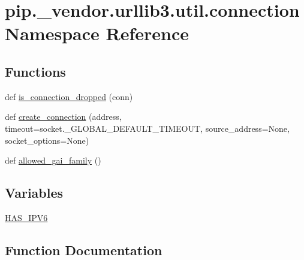 \hypertarget{namespacepip_1_1__vendor_1_1urllib3_1_1util_1_1connection}{}\section{pip.\+\_\+vendor.\+urllib3.\+util.\+connection Namespace Reference}
\label{namespacepip_1_1__vendor_1_1urllib3_1_1util_1_1connection}
\subsection*{Functions}
\begin{DoxyCompactItemize}
\item 
def \hyperlink{namespacepip_1_1__vendor_1_1urllib3_1_1util_1_1connection_a6c618fbfddec1d95e0e68c3264af79b8}{is\+\_\+connection\+\_\+dropped} (conn)
\item 
def \hyperlink{namespacepip_1_1__vendor_1_1urllib3_1_1util_1_1connection_a5e050e8da1c17c682e25e14dacde39f0}{create\+\_\+connection} (address, timeout=socket.\+\_\+\+G\+L\+O\+B\+A\+L\+\_\+\+D\+E\+F\+A\+U\+L\+T\+\_\+\+T\+I\+M\+E\+O\+UT, source\+\_\+address=None, socket\+\_\+options=None)
\item 
def \hyperlink{namespacepip_1_1__vendor_1_1urllib3_1_1util_1_1connection_a23415bf42519d8c4f64e03fdd832611a}{allowed\+\_\+gai\+\_\+family} ()
\end{DoxyCompactItemize}
\subsection*{Variables}
\begin{DoxyCompactItemize}
\item 
\hyperlink{namespacepip_1_1__vendor_1_1urllib3_1_1util_1_1connection_a6373d0f057a94f482db77884d8310280}{H\+A\+S\+\_\+\+I\+P\+V6}
\end{DoxyCompactItemize}


\subsection{Function Documentation}
\mbox{\label{namespacepip_1_1__vendor_1_1urllib3_1_1util_1_1connection_a23415bf42519d8c4f64e03fdd832611a}} 
